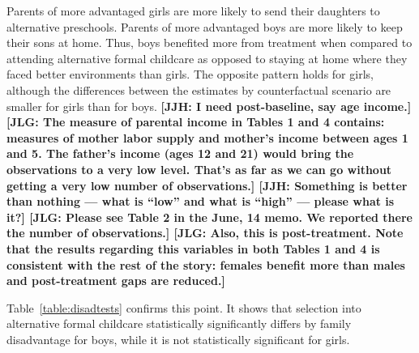 Parents of more advantaged girls are more likely to send their daughters to alternative preschools. Parents of more advantaged boys are more likely to keep their sons at home. Thus, boys benefited more from treatment when compared to attending alternative formal childcare as opposed to staying at home where they faced better environments than girls. The opposite pattern holds for girls, although the differences between the estimates by counterfactual scenario are smaller for girls than for boys. \textbf{[JJH: I need post-baseline, say age income.] [JLG: The measure of parental income in Tables 1 and 4 contains: measures of mother labor supply and mother's income between ages 1 and 5. The father's income (ages 12 and 21) would bring the observations to a very low level. That's as far as we can go without getting a very low number of observations.] [JJH: Something is better than nothing --- what is ``low'' and what is ``high'' --- please what is it?] [JLG: Please see Table 2 in the June, 14 memo. We reported there the number of observations.]
[JLG: Also, this is post-treatment. Note that the results regarding this variables in both Tables 1 and 4 is consistent with the rest of the story: females benefit more than males and post-treatment gaps are reduced.]}

Table~\ref{table:disadtests} confirms this point. It shows that selection into alternative formal childcare statistically significantly differs by family disadvantage for boys, while it is not statistically significant for girls.

